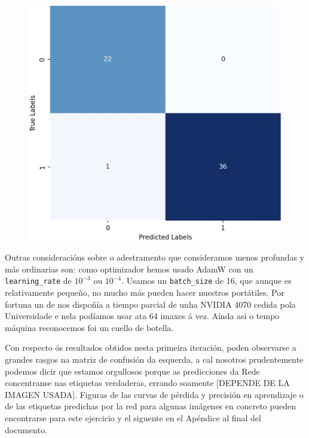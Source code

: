 \documentclass{article}
\begin{document}
\begin{figure}
	\includegraphics[width=1\linewidth]{cmEj1} 
	\label{fig:cmEj1}
\end{figure}


Outras consideracións sobre o adestramento que consideramos menos profundas y más ordinarias son: como optimizador hemos usado AdamW\cite{DBLP:journals/corr/abs-1711-05101} con un \texttt{learning\_rate} de $10^{-3}$ ou $10^{-4}$. Usamos un \texttt{batch\_size} de 16, que aunque es relativamente pequeño, no mucho más pueden hacer nuestros portátiles. Por fortuna un de nos dispoñía a tiempo parcial de unha NVIDIA 4070 cedida pola Universidade e nela podíamos usar ata 64 imaxes á vez. Aínda así o tempo máquina reconocemos foi un cuello de botella. 

Con respecto ós resultados obtidos nesta primeira iteración, poden observarse a grandes rasgos na matriz de confusión da esquerda, a cal nosotros prudentemente podemos dicir que estamos orgullosos porque as predicciones da Rede concentranse nas etiquetas verdaderas, errando soamente [DEPENDE DE LA IMAGEN USADA]. Figuras de las curvas de pérdida y precisión en aprendizaje o de las etiquetas predichas por la red para algunas imágenes en concreto pueden encontrarse para este ejercicio y el siguente en el Apéndice al final del documento.
\end{document}

